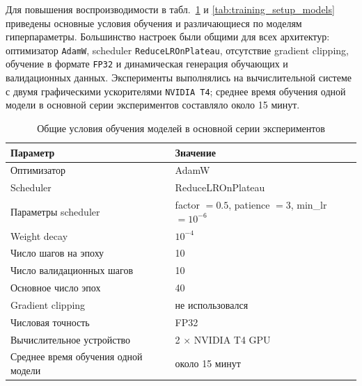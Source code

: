 Для повышения воспроизводимости в табл.~\ref{tab:training_setup_common} и \ref{tab:training_setup_models} приведены основные условия обучения и различающиеся по моделям гиперпараметры. Большинство настроек были общими для всех архитектур: оптимизатор \texttt{AdamW}, scheduler \texttt{ReduceLROnPlateau}, отсутствие gradient clipping, обучение в формате \texttt{FP32} и динамическая генерация обучающих и валидационных данных. Эксперименты выполнялись на вычислительной системе с двумя графическими ускорителями \texttt{NVIDIA T4}; среднее время обучения одной модели в основной серии экспериментов составляло около 15 минут.

\begin{table}[H]
    \centering
    \caption{Общие условия обучения моделей в основной серии экспериментов}
    \label{tab:training_setup_common}
    \begin{tabular}{|l|l|}
        \hline
        Параметр & Значение \\
        \hline
        Оптимизатор & AdamW \\
        Scheduler & ReduceLROnPlateau \\
        Параметры scheduler & factor $= 0.5$, patience $= 3$, min\_lr $= 10^{-6}$ \\
        Weight decay & $10^{-4}$ \\
        Число шагов на эпоху & 10 \\
        Число валидационных шагов & 10 \\
        Основное число эпох & 40 \\
        Gradient clipping & не использовался \\
        Числовая точность & FP32 \\
        Вычислительное устройство & 2 $\times$ NVIDIA T4 GPU \\
        Среднее время обучения одной модели & около 15 минут \\
        \hline
    \end{tabular}
\end{table}

